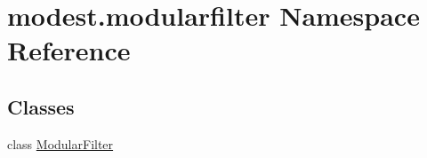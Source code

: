\hypertarget{namespacemodest_1_1modularfilter}{}\section{modest.\+modularfilter Namespace Reference}
\label{namespacemodest_1_1modularfilter}
\subsection*{Classes}
\begin{DoxyCompactItemize}
\item 
class \hyperlink{classmodest_1_1modularfilter_1_1ModularFilter}{Modular\+Filter}
\end{DoxyCompactItemize}

